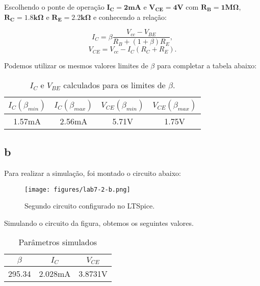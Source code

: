 \documentclass[a4paper]{report}
\begin{document}
Escolhendo o ponte de operação $\mathbf{I_C = 2mA}$ e $\mathbf{V_{CE} = 4V}$ com $\mathbf{R_B = 1M \Omega}$, $\mathbf{R_C = 1.8k\Omega}$ e $\mathbf{R_E = 2.2 k \Omega}$ e conhecendo a relação:


\begin{equation}
        I_C = \beta \frac{V_{cc}-V_{BE}}{R_B+ (1+\beta)R_E},
\end{equation}
\begin{equation} 
        V_{CE} = V_{cc} - I_C (R_C + R_E).
\end{equation}



Podemos utilizar os mesmos valores limites de $\beta$ para completar a tabela abaixo:
\begin{table}[H]
    \centering
    \begin{tabular}{|c|c|c|c|}
    \hline
    $I_C(\beta_{min})$	&	$I_C(\beta_{max})$	&	$V_{CE}(\beta_{min})$	&	$V_{CE}(\beta_{max})$	\\	\hline
1.57mA	&	2.56mA	&	5.71V	&	1.75V	\\	\hline

    \end{tabular}
    \caption{$I_C$ e $V_{BE}$ calculados para os limites de $\beta$.}
    \label{tab:Q2a}
\end{table}
\subsection*{b}

Para realizar a simulação, foi montado o circuito abaixo:

\begin{figure}[H]
    \centering
    \texttt{[image: figures/lab7-2-b.png]}
    \caption{Segundo circuito configurado no LTSpice.}
    \label{fig:figures-lab7-1-c-png}
\end{figure}


Simulando o circuito da figura, obtemos os seguintes valores.

\begin{table}[!h]
    \centering
    \begin{tabular}{|c|c|c|}
        \hline
         $\beta$	&	$I_C$	&	$V_{CE}$	\\	\hline
295.34	&	2.028mA	&	3.8731V	\\	\hline

    \end{tabular}
    \caption{Parâmetros simulados}
    \label{tab:Q2b}
\end{table}
\end{document}
